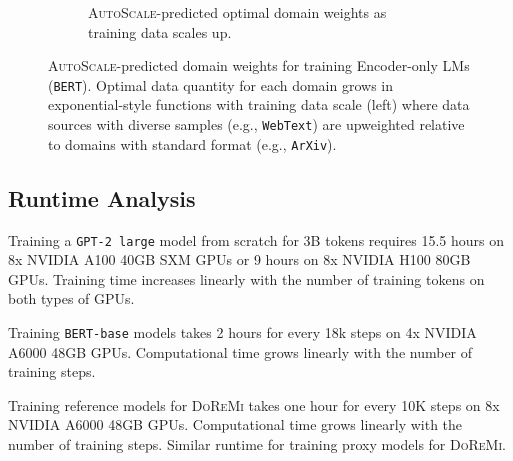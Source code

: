 \documentclass{article} %
\begin{document}
\begin{appendices}{}
\begin{figure}[h!]
\begin{subfigure}[b]{0.51\textwidth}
        \caption{\textsc{AutoScale}-predicted optimal domain weights as training data scales up.}
        \label{fig:bert_additional_sub_2}
    \end{subfigure}
    \caption{\textsc{AutoScale}-predicted domain weights for training Encoder-only LMs (\texttt{BERT}). Optimal data quantity for each domain grows in exponential-style functions with training data scale (left) where data sources with diverse samples (e.g., \texttt{WebText}) are upweighted relative to domains with standard format (e.g., \texttt{ArXiv}).}
    \label{fig:bert_additional}
\end{figure}


\begin{table}[h!]\vspace{-0em}\caption{\textsc{AutoScale} notably improving training efficiency for \texttt{BERT} models on all scales–even for a considerably large scale, 288k steps, the speedup margin remains visible.}\label{table10}\vspace{-0.5em}
\end{table}

\subsection{Runtime Analysis}\label{runtime}
Training a \texttt{GPT-2 large} model from scratch for 3B tokens requires 15.5 hours on 8x NVIDIA A100 40GB SXM GPUs or 9 hours on 8x NVIDIA H100 80GB GPUs. Training time increases linearly with the number of training tokens on both types of GPUs.

Training \texttt{BERT-base} models takes 2 hours for every 18k steps on 4x NVIDIA A6000 48GB GPUs. Computational time grows linearly with the number of training steps.

Training reference models for \textsc{DoReMi} takes one hour for every 10K steps on 8x NVIDIA A6000 48GB GPUs. Computational time grows linearly with the number of training steps. Similar runtime for training proxy models for \textsc{DoReMi}. 



\end{appendices}
\end{document}
